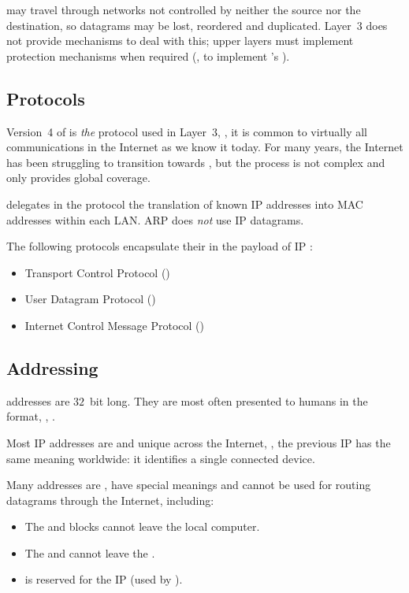  may travel through networks not controlled 
by neither the source nor the destination, so datagrams may be lost, reordered and duplicated.
% 
Layer~3 does not provide mechanisms to deal with this; upper layers must implement
protection mechanisms when required 
(\eg, to implement 's ).


\vspace{-0.25cm}
\subsection*{Protocols}

Version~4 of  is \textit{the} protocol used in Layer~3, \ie,
it is common to virtually all communications in the Internet as we know it today.
% 
For many years, the Internet has been struggling to transition towards , 
but the process is not complex and only  provides global coverage.

 delegates in the  protocol the translation of known IP addresses 
into MAC addresses within each LAN. ARP does \textit{not} use IP datagrams.

The following protocols encapsulate their  in the payload of IP 
:\\[-0.6cm]
\begin{itemize}
\item Transport Control Protocol () 
\item User Datagram Protocol ()
\item Internet Control Message Protocol ()
\end{itemize}


\subsection*{Addressing}

 addresses are $32$~bit long. They are most often presented to humans in
the  format, \eg, . 

Most IP addresses are  and unique across the Internet, 
\ie, the previous IP has the same meaning worldwide: it identifies a single connected device.

Many addresses are , have special meanings
and cannot be used for routing datagrams through the Internet, including:
\begin{itemize}
\item The  and  blocks cannot leave the local computer.
\item The  and  cannot leave the .
\item {} is reserved for the  IP 
(used by ).
\end{itemize}

